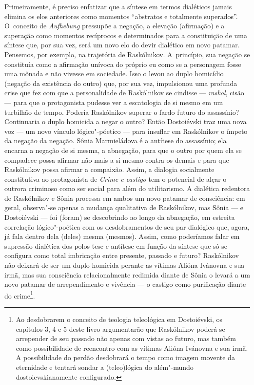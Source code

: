 Primeiramente, é preciso enfatizar que a síntese em termos dialéticos
jamais elimina os elos anteriores como momentos ``abstratos e totalmente
superados''. O~conceito de \emph{Aufhebung} pressupõe a negação, a
elevação (afirmação) e a superação como momentos recíprocos e
determinados para a constituição de uma síntese que, por sua vez, será
um novo elo do devir dialético em novo patamar. Pensemos, por exemplo,
na trajetória de Raskólnikov. A~princípio, sua negação se constituía
como a afirmação unívoca do próprio eu como se a personagem fosse uma
mônada e não vivesse em sociedade. Isso o levou ao duplo homicídio
(negação da existência do outro) que, por sua vez, impulsionou uma
profunda crise que fez com que a personalidade de Raskólnikov se
cindisse --- \emph{raskol}, cisão --- para que o protagonista pudesse ver
a escatologia de si mesmo em um turbilhão de tempo. Poderia Raskólnikov
superar o fardo futuro do assassínio? Continuaria o duplo homicida a
negar o outro? Então Dostoiévski traz uma nova voz --- um novo vínculo
lógico"-póetico --- para insuflar em Raskólnikov o ímpeto da negação da
negação. Sônia Marmieládova é a antítese do assassínio; ela encarna a
negação de si mesma, a abnegação, para que o outro por quem ela se
compadece possa afirmar não mais a si mesmo contra os demais e para que
Raskólnikov possa afirmar a compaixão. Assim, a dialogia socialmente
constitutiva ao protagonista de \emph{Crime e castigo} tem o potencial
de alçar o outrora criminoso como ser social para além do utilitarismo.
A dialética redentora de Raskólnikov e Sônia processa em ambos um novo
patamar de consciência: em geral, observa"-se apenas a mudança
qualitativa de Raskólnikov, mas Sônia --- e Dostoiévski --- foi (foram) se
descobrindo ao longo da abnegação, em estreita correlação lógico"-poética
com os desdobramentos de seu par dialógico que, agora, já fala dentro
dela (deles) mesma (mesmos). Assim, como poderíamos falar em supressão
dialética dos polos tese e antítese em função da síntese que só se
configura como total imbricação entre presente, passado e futuro?
Raskólnikov não deixará de ser um duplo homicida perante as vítimas
Alióna Ivánovna e sua irmã, mas sua consciência relacionalmente redimida
diante de Sônia o levará a um novo patamar de arrependimento e vivência
--- o castigo como purificação diante do crime\footnote{Ao desdobrarem o
  conceito de teologia teleológica em Dostoiévski, os capítulos 3, 4 e 5
  deste livro argumentarão que Raskólnikov poderá se arrepender de seu
  passado não apenas com vistas ao futuro, mas também como possibilidade
  de reencontro com as vítimas Alióna Ivánovna e sua irmã. A
  possibilidade do perdão desdobrará o tempo como imagem movente da
  eternidade e tentará sondar a (teleo)lógica do além"-mundo
  dostoievskianamente configurado.}.


